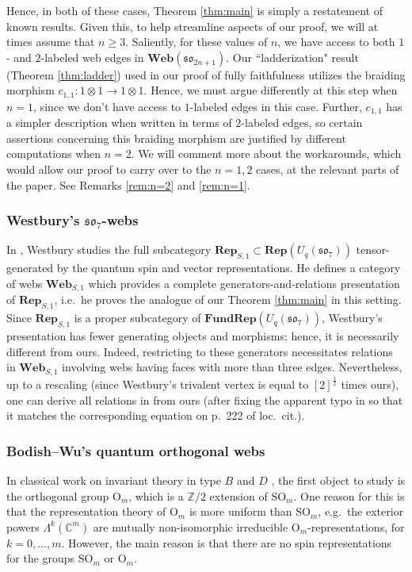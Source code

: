 \documentclass[10pt]{amsart}
\numberwithin{equation}{section}
\theoremstyle{definition}
\renewcommand{\to}{\rightarrow}
\newcommand{\son}[1][2n+1]{\mathfrak{so}_{#1}}
\newcommand{\Rep}{\mathbf{Rep}}
\newcommand{\FRep}{\mathbf{FundRep}}
\newcommand{\Web}{\mathbf{Web}}
\begin{document}
Hence, in both of these cases, Theorem \ref{thm:main} is simply a restatement of known results.
Given this, to help streamline aspects of our proof, 
we will at times assume that $n \geq 3$.
Saliently, for these values of $n$, 
we have access to both $1$- and $2$-labeled web edges in $\Web(\son)$. 
Our ``ladderization" result (Theorem \ref{thm:ladder}) used in our
proof of fully faithfulness utilizes the braiding morphism 
$c_{1,1} \colon 1 \otimes 1 \to 1 \otimes 1$.
Hence, we must argue differently at this step when $n=1$, 
since we don't have access to $1$-labeled edges in this case. 
Further, $c_{1,1}$ has a simpler description when written in terms of $2$-labeled edges, 
so certain assertions concerning this braiding morphism 
are justified by different computations when $n=2$.
We will comment more about the workarounds, 
which would allow our proof to carry over to the $n=1,2$ cases, 
at the relevant parts of the paper.
See Remarks \ref{rem:n=2} and \ref{rem:n=1}.


\subsubsection{Westbury's $\son[7]$-webs}

In \cite{WesSpin}, Westbury studies the full subcategory 
$\Rep_{S,1} \subset \Rep(U_q(\son[7]))$ 
tensor-generated by the quantum spin and vector representations. 
He defines a category of webs $\Web_{S,1}$ which 
provides a complete generators-and-relations presentation of $\Rep_{S,1}$, 
i.e.~he proves the analogue of our Theorem \ref{thm:main} in this setting.
Since $\Rep_{S,1}$ is a proper subcategory of $\FRep(U_q(\son[7]))$, 
Westbury's presentation has fewer generating objects and morphisms; 
hence, it is necessarily different from ours.
Indeed, restricting to these generators necessitates relations 
in $\Web_{S,1}$ involving webs having
faces with more than three edges.
Nevertheless, up to a rescaling 
(since Westbury's trivalent vertex is equal to $[2]^{\frac{1}{2}}$ times ours),
one can derive all relations in \cite[Fig.~1--4]{WesSpin} from ours
(after fixing the apparent typo in \cite[Fig.~4]{WesSpin} so that it matches 
the corresponding equation on p.~222 of loc.~cit.).


\subsubsection{Bodish--Wu's quantum orthogonal webs}

In classical work on invariant theory in type $B$ and $D$ \cite{Braueroriginal, LZbrauer}, 
the first object to study is the orthogonal group $\mathrm{O}_m$, 
which is a $\mathbb{Z}/2$ extension of $\mathrm{SO}_m$. 
One reason for this is that the representation theory of $\mathrm{O}_m$ 
is more uniform than $\mathrm{SO}_m$, 
e.g.~the exterior powers $\Lambda^k(\mathbb{C}^m)$ are mutually 
non-isomorphic irreducible $\mathrm{O}_m$-representations, for $k=0, \dots, m$. 
However, the main reason is that there are no spin representations 
for the groups $\mathrm{SO}_m$ or $\mathrm{O}_m$. 
\end{document}
